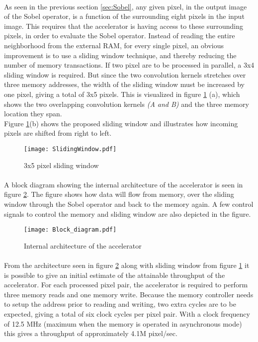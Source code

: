 \paragraph*{}
As seen in the previous section \ref{sec:Sobel}, any given pixel, in the output image of the Sobel operator, is a function of the surrounding eight pixels in the input image. This requires that the accelerator is having access to these surrounding pixels, in order to evaluate the Sobel operator. Instead of reading the entire neighborhood from the external RAM, for every single pixel, an obvious improvement is to use a sliding window technique, and thereby reducing the number of memory transactions. If two pixel are to be processed in parallel, a 3x4 sliding window is required. But since the two convolution kernels stretches over three memory addresses, the width of the sliding window must be increased by one pixel, giving a total of 3x5 pixels. This is visualized in figure \ref{fig:shift_register} (a), which shows the two overlapping convolution kernels \emph{(A and B)} and the three memory location they span. \\
Figure \ref{fig:shift_register}(b) shows the proposed sliding window and illustrates how incoming pixels are shifted from right to left.

\begin{figure}[H]
	\centering
	\texttt{[image: SlidingWindow.pdf]}
	\caption{3x5 pixel sliding window}
	\label{fig:shift_register}
\end{figure}

\paragraph*{}
A block diagram showing the internal architecture of the accelerator is seen in figure \ref{fig:AccBlockDiagram}. The figure shows how data will flow from memory, over the sliding window through the Sobel operator and back to the memory again. A few control signals to control the memory and sliding window are also depicted in the figure. 

\begin{figure}[H]
	\centering
	\texttt{[image: Block\_diagram.pdf]}
	\caption{Internal architecture of the accelerator}
	\label{fig:AccBlockDiagram}
\end{figure}

\paragraph*{}
From the architecture seen in figure \ref{fig:AccBlockDiagram} along with sliding window from figure \ref{fig:shift_register} it is possible to give an initial estimate of the attainable throughput of the accelerator. For each processed pixel pair, the accelerator is required to perform three memory reads and one memory write. Because the memory controller needs to setup the address prior to reading and writing, two extra cycles are to be expected, giving a total of six clock cycles per pixel pair.
With a clock frequency of 12.5 MHz (maximum when the memory is operated in asynchronous mode) this gives a throughput of approximately 4.1M pixel/sec.
